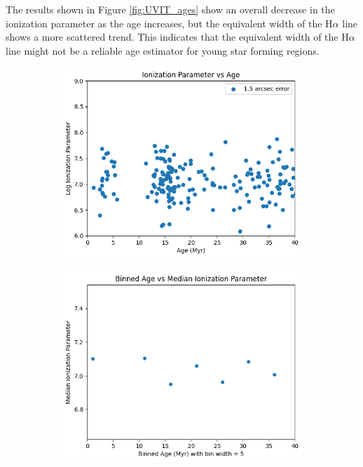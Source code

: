 \documentclass[12pt]{report}
\begin{document}
The results shown in Figure \ref{fig:UVIT_ages} show an overall decrease in the ionization parameter as the age increases, but the equivalent width of the H$\alpha$ line shows a more scattered trend. This indicates that the equivalent width of the H$\alpha$ line might not be a reliable age estimator for young star forming regions. 

\begin{figure}[htbp]
    \centering

    \begin{subfigure}{0.45\textwidth}
        \centering
        \includegraphics[width=\linewidth]{image22.png}
        \label{fig:image22}
    \end{subfigure}
    \hfill
    \begin{subfigure}{0.45\textwidth}
        \centering
        \includegraphics[width=\linewidth]{image24.png}
        \label{fig:image24}
    \end{subfigure}
    \label{fig: image2224}



\end{figure}
\end{document}
